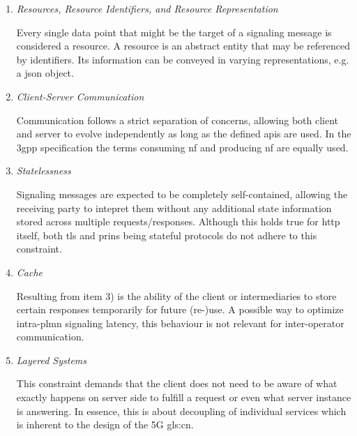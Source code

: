 \begin{enumerate}[label=\arabic*), wide, labelwidth=!, labelindent=0pt]
    \item \textit{Resources, Resource Identifiers, and Resource Representation}
    
    \noindent
    Every single data point that might be the target of a signaling message is considered a resource.
    A resource is an abstract entity that may be referenced by identifiers.
    Its information can be conveyed in varying representations, e.g. a \gls{json} object.

    \item \textit{Client-Server Communication}

    \noindent
    Communication follows a strict separation of concerns, allowing both client and server to evolve independently as long as the defined \glspl{api} are used.
    In the \gls{3gpp} specification the terms consuming \gls{nf} and producing \gls{nf} are equally used.

    \item \textit{Statelessness}

    \noindent
    Signaling messages are expected to be completely self-contained, allowing the receiving party to intepret them without any additional state information stored across multiple requests/responses.
    Although this holds true for \gls{http} itself, both \gls{tls} and \gls{prins} being stateful protocols do not adhere to this constraint.

    \item \textit{Cache}

    \noindent
    Resulting from item 3) is the ability of the client or intermediaries to store certain responses temporarily for future (re-)use.
    A possible way to optimize intra-\gls{plmn} signaling latency, this behaviour is not relevant for inter-operator communication.

    \item \textit{Layered Systems}

    \noindent
    This constraint demands that the client does not need to be aware of what exactly happens on server side to fulfill a request or even what server instance is answering.
    In essence, this is about decoupling of individual services which is inherent to the design of the 5G \gls{gls:cn}.

\end{enumerate}

